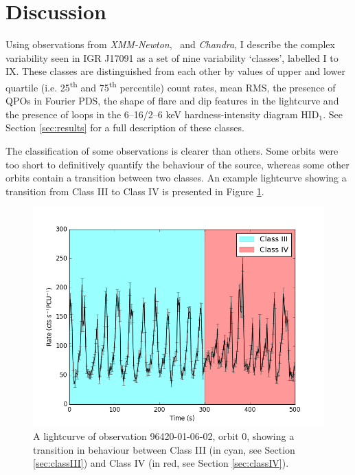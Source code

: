 \section{Discussion}

\par Using observations from \textit{XMM-Newton}, \rxte\ and \textit{Chandra}, I describe the complex variability seen in IGR J17091 as a set of nine variability `classes', labelled I to IX.  These classes are distinguished from each other by values of upper and lower quartile (i.e. 25\textsuperscript{th} and 75\textsuperscript{th} percentile) count rates, mean RMS, the presence of QPOs in Fourier PDS, the shape of flare and dip features in the lightcurve and the presence of loops in the 6--16/2--6 keV hardness-intensity diagram HID$_1$.  See Section \ref{sec:results} for a full description of these classes.
\par The classification of some observations is clearer than others.  Some orbits were too short to definitively quantify the behaviour of the source, whereas some other orbits contain a transition between two classes.  An example lightcurve showing a transition from Class III to Class IV is presented in Figure \ref{fig:HybridClasses}.

\begin{figure}
    \includegraphics[width=\columnwidth, trim =0cm 0 0cm 0]{images/mixJandK.png}
    \captionsetup{singlelinecheck=off}
    \caption[A lightcurve of observation 96420-01-06-02, showing a transition in behaviour between Classes IV and V.]{A lightcurve of observation 96420-01-06-02, orbit 0, showing a transition in behaviour between Class III (in cyan, see Section \ref{sec:classIII}) and Class IV (in red, see Section \ref{sec:classIV}).}
   \label{fig:HybridClasses}
\end{figure}

